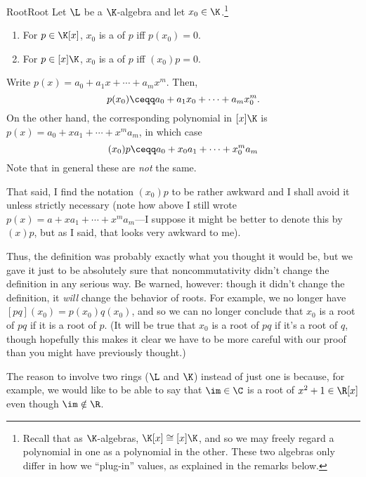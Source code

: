 \begin{dfn}{Root}{Root}
	Let $\L$ be a $\K$-algebra and let $x_0\in \K$.\footnote{Recall that as $\K$-algebras, $\K [x]\cong [x]\K$, and so we may freely regard a polynomial in one as a polynomial in the other.  These two algebras only differ in how we ``plug-in'' values, as explained in the remarks below.}
	\begin{enumerate}
		\item For $p\in \K [x]$, $x_0$ is a  of $p$ iff $p(x_0)=0$.
		\item For $p\in [x]\K$, $x_0$ is a  of $p$ iff $(x_0)p=0$.
	\end{enumerate}
	\begin{rmk}
		Write $p(x)=a_0+a_1x+\cdots +a_mx^m$.  Then,
		\begin{equation}
			p(x_0)\ceqq a_0+a_1x_0+\cdots +a_mx_0^m.
		\end{equation}
		On the other hand, the corresponding polynomial in $[x]\K$ is $p(x)=a_0+xa_1+\cdots +x^ma_m$, in which case
		\begin{equation}
			(x_0)p\ceqq a_0+x_0a_1+\cdots +x_0^ma_m
		\end{equation}
		Note that in general these are \emph{not} the same.  
		
		That said, I find the notation $(x_0)p$ to be rather awkward and I shall avoid it unless strictly necessary (note how above I still wrote $p(x)=a+xa_1+\cdots +x^ma_m$---I suppose it might be better to denote this by $(x)p$, but as I said, that looks very awkward to me). 
	\end{rmk}
	\begin{rmk}
		Thus, the definition was probably exactly what you thought it would be, but we gave it just to be absolutely sure that noncommutativity didn't change the definition in any serious way.  Be warned, however:  though it didn't change the definition, it \emph{will} change the behavior of roots.  For example, we no longer have $[pq](x_0)=p(x_0)q(x_0)$, and so we can no longer conclude that $x_0$ is a root of $pq$ if it is a root of $p$.  (It will be true that $x_0$ is a root of $pq$ if it's a root of $q$, though hopefully this makes it clear we have to be more careful with our proof than you might have previously thought.)
	\end{rmk}
	\begin{rmk}
		The reason to involve two rings ($\L$ and $\K$) instead of just one is because, for example, we would like to be able to say that $\im \in \C$ is a root of $x^2+1\in \R [x]$ even though $\im \notin \R$.
	\end{rmk}
\end{dfn}
